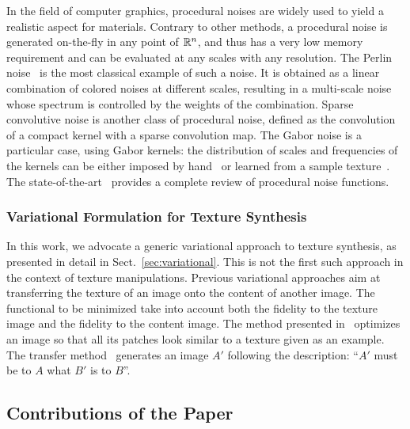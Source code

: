 In the field of computer graphics, procedural noises are widely used to yield a realistic aspect for materials.
Contrary to other methods, a procedural noise is generated on-the-fly in any point of $\mathbb{R}^n$, and thus has a very low memory requirement and can be evaluated at any scales with any resolution.
The Perlin noise~\cite{perlin1985image} is the most classical example of such a noise.
It is obtained as a linear combination of colored noises at different scales, resulting in a multi-scale noise whose spectrum is controlled by the weights of the combination.
Sparse convolutive noise is another class of procedural noise, defined as the convolution of a compact kernel with a sparse convolution map.
The Gabor noise is a particular case, using Gabor kernels: the distribution of scales and frequencies of the kernels can be either imposed by hand~\cite{lagae2009procedural} or learned from a sample texture~\cite{galerne2012gabor}.
The state-of-the-art~\cite{lagae2010state} provides a complete review of procedural noise functions.


\subsubsection{Variational Formulation for Texture Synthesis}

In this work, we advocate a generic variational approach to texture synthesis, as presented in detail in Sect.~\ref{sec:variational}.
This is not the first such approach in the context of texture manipulations.
Previous variational approaches aim at transferring the texture of an image onto the content of another image.
The functional to be minimized take into account both the fidelity to the texture image and the fidelity to the content image.
The method presented in~\cite{kwatra2005texture} optimizes an image so that all its patches look similar to a texture given as an example.
The transfer method~\cite{ramanarayanan2007constrained} generates an image $A'$ following the description: ``$A'$ must be to $A$ what $B'$ is to $B$''.


\subsection{Contributions of the Paper}
\label{sub:approach}

